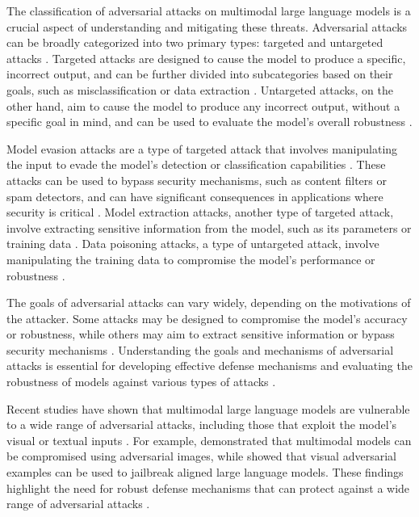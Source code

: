 \documentclass[11pt,a4paper]{article}
\begin{document}
The classification of adversarial attacks on multimodal large language models is a crucial aspect of understanding and mitigating these threats. Adversarial attacks can be broadly categorized into two primary types: targeted and untargeted attacks \cite{doi:10.18653/v1/n19-1314}. Targeted attacks are designed to cause the model to produce a specific, incorrect output, and can be further divided into subcategories based on their goals, such as misclassification or data extraction \cite{arxiv:2308.12833}. Untargeted attacks, on the other hand, aim to cause the model to produce any incorrect output, without a specific goal in mind, and can be used to evaluate the model's overall robustness \cite{arxiv:2406.00240}.

Model evasion attacks are a type of targeted attack that involves manipulating the input to evade the model's detection or classification capabilities \cite{arxiv:2402.02309}. These attacks can be used to bypass security mechanisms, such as content filters or spam detectors, and can have significant consequences in applications where security is critical \cite{doi:10.1145/3712001}. Model extraction attacks, another type of targeted attack, involve extracting sensitive information from the model, such as its parameters or training data \cite{doi:10.53941/tai.2025.100003}. Data poisoning attacks, a type of untargeted attack, involve manipulating the training data to compromise the model's performance or robustness \cite{arxiv:2409.18142}.

The goals of adversarial attacks can vary widely, depending on the motivations of the attacker. Some attacks may be designed to compromise the model's accuracy or robustness, while others may aim to extract sensitive information or bypass security mechanisms \cite{doi:10.1145/3764113}. Understanding the goals and mechanisms of adversarial attacks is essential for developing effective defense mechanisms and evaluating the robustness of models against various types of attacks \cite{arxiv:2409.18991}.

Recent studies have shown that multimodal large language models are vulnerable to a wide range of adversarial attacks, including those that exploit the model's visual or textual inputs \cite{arxiv:2408.13461}. For example, \cite{doi:10.1109/iccvw60793.2023.00395} demonstrated that multimodal models can be compromised using adversarial images, while \cite{doi:10.1609/aaai.v38i19.30150} showed that visual adversarial examples can be used to jailbreak aligned large language models. These findings highlight the need for robust defense mechanisms that can protect against a wide range of adversarial attacks \cite{arxiv:2502.01576}.
\end{document}
